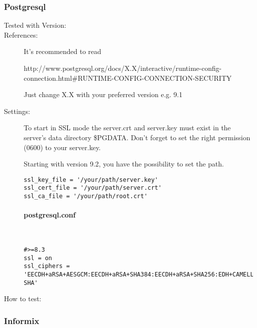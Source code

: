 \subsubsection{Postgresql}

\begin{description}
\item[Tested with Version:]


\item[References:]

It's recommended to read 

http://www.postgresql.org/docs/X.X/interactive/runtime-config-connection.html\#RUNTIME-CONFIG-CONNECTION-SECURITY

Just change X.X with your preferred version e.g. 9.1

\item[Settings:] \mbox{}


To start in SSL mode the server.crt and server.key must exist in the server's data directory \$PGDATA. 
Don't forget to set the right permission (0600) to your server.key. 

Starting with version 9.2, you have the possibility to set the path.

\begin{lstlisting}[breaklines]
ssl_key_file = '/your/path/server.key'
ssl_cert_file = '/your/path/server.crt'
ssl_ca_file = '/your/path/root.crt'
\end{lstlisting}

\paragraph*{postgresql.conf}\mbox{}\\

\begin{lstlisting}[breaklines]
#>=8.3
ssl = on 
ssl_ciphers = 'EECDH+aRSA+AESGCM:EECDH+aRSA+SHA384:EECDH+aRSA+SHA256:EDH+CAMELLIA256:EECDH:EDH+aRSA:+SSLv3:!aNULL:!eNULL:!LOW:!3DES:!MD5:!EXP:!PSK:!SRP:!DSS:!RC4:!SEED:!AES128:!CAMELLIA128:!ECDSA:AES256-SHA'
\end{lstlisting}



\item[How to test:]


\end{description}




\subsubsection{Informix}
